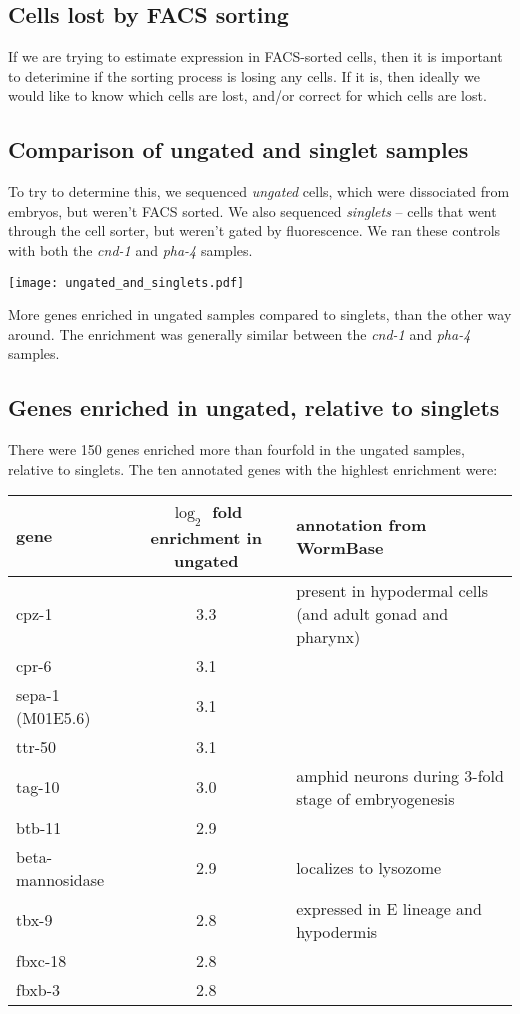 \documentclass{article}
\begin{document}
\subsection*{Cells lost by FACS sorting}

If we are trying to estimate expression in FACS-sorted
cells, then it is important to deterimine if the sorting
process is losing any cells. If it is, then ideally
we would like to know which cells are lost, and/or
correct for which cells are lost.

\subsection*{Comparison of ungated and singlet samples}

To try to determine this,
we sequenced {\em ungated} cells, which were dissociated
from embryos, but weren't FACS sorted. We also sequenced
{\em singlets} -- cells that went through the cell sorter,
but weren't gated by fluorescence. We ran these controls
with both the {\em cnd-1} and {\em pha-4} samples.

\begin{center}
\texttt{[image: ungated\_and\_singlets.pdf]}
\end{center}

More genes enriched in ungated samples compared to singlets,
than the other way around. The enrichment was generally similar
between the {\em cnd-1} and {\em pha-4} samples.

\subsection*{Genes enriched in ungated, relative to singlets}

There were 150 genes enriched more than fourfold in the ungated samples,
relative to singlets.
The ten annotated genes with the highlest enrichment were:

\begin{tabular}{lcl}
gene & $\log_2$ fold enrichment in ungated & annotation from WormBase \\
\hline
cpz-1 & 3.3 & present in hypodermal cells (and adult gonad and pharynx) \\
cpr-6 & 3.1 &  \\
sepa-1 (M01E5.6) & 3.1 &   \\
ttr-50 & 3.1 &  \\
tag-10 & 3.0 & amphid neurons during 3-fold stage of embryogenesis \\
btb-11 & 2.9 &  \\
beta-mannosidase & 2.9 & localizes to lysozome \\
tbx-9 & 2.8 & expressed in E lineage and hypodermis \\
fbxc-18 & 2.8 &  \\
fbxb-3 & 2.8 & \\
\end{tabular}
\end{document}
